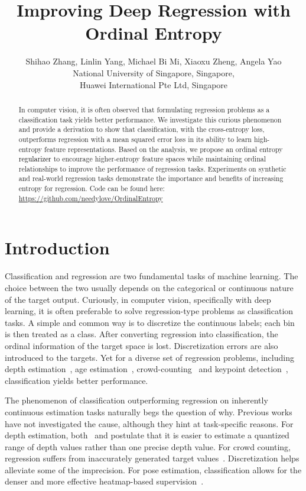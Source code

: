 \documentclass{article} \usepackage{iclr2023_conference,times}
\title{Improving Deep Regression with Ordinal Entropy}
\author{Shihao Zhang, Linlin Yang, Michael Bi Mi, Xiaoxu Zheng, Angela Yao \\
National University of Singapore, Singapore, \\ 
Huawei International Pte Ltd, Singapore
}
\def\shihao{\textcolor{black}}
\begin{document}
\maketitle

\begin{abstract}
In computer vision, it is often observed that formulating regression problems as a classification task yields better performance.  
We investigate this curious phenomenon and provide a derivation to show that classification, with the cross-entropy loss, outperforms 
regression with a mean squared error loss in its ability to learn high-entropy feature representations.
Based on the analysis, we propose an ordinal entropy \shihao{regularizer} to encourage higher-entropy feature spaces while maintaining ordinal relationships to improve the performance of regression tasks.
Experiments on synthetic and real-world regression tasks demonstrate the 
importance and benefits of increasing entropy for regression. Code can be found here: \url{https://github.com/needylove/OrdinalEntropy}
\end{abstract}

\section{Introduction}
\label{sec:introduction}

Classification and regression are two fundamental tasks of machine learning. The choice between the two usually depends on the categorical or continuous nature of the target output. Curiously, in computer vision, specifically with deep learning, it is often preferable to solve regression-type problems as classification tasks. A simple and common way is to discretize the continuous labels; each bin is then treated as a class. After converting regression into classification, the ordinal information of the target space is lost. Discretization errors are also introduced to the targets. Yet for a diverse set of regression problems, including depth estimation~\citep{cao2017estimating}, age estimation~\citep{rothe2015dex}, crowd-counting~\citep{liu2019counting} and keypoint detection~\citep{li20212d}, classification yields better performance.


The phenomenon of classification outperforming regression on inherently continuous estimation tasks naturally begs the question of why. Previous works have not investigated the cause, although they hint at task-specific reasons. 
For depth estimation, both~\cite{cao2017estimating} and \cite{fu2018deep} postulate that it is easier to estimate a quantized range of depth values rather than one precise depth value. 
For crowd counting, regression suffers from inaccurately generated target values~\citep{xiong2022discrete}. Discretization helps alleviate some of the imprecision. For pose estimation, classification allows for the denser and more effective heatmap-based supervision~\citep{zhang2020distribution,gu2021removing,gu2021dive}. 
\end{document}
